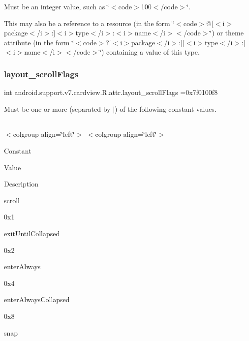 Must be an integer value, such as \char`\"{}$<$code$>$100$<$/code$>$\char`\"{}. 

This may also be a reference to a resource (in the form \char`\"{}$<$code$>$@\mbox{[}$<$i$>$package$<$/i$>$\+:\mbox{]}$<$i$>$type$<$/i$>$\+:$<$i$>$name$<$/i$>$$<$/code$>$\char`\"{}) or theme attribute (in the form \char`\"{}$<$code$>$?\mbox{[}$<$i$>$package$<$/i$>$\+:\mbox{]}\mbox{[}$<$i$>$type$<$/i$>$\+:\mbox{]}$<$i$>$name$<$/i$>$$<$/code$>$\char`\"{}) containing a value of this type. \mbox{\label{classandroid_1_1support_1_1v7_1_1cardview_1_1R_1_1attr_a3b3c1117c3a692d7602eb20227ea8e17}} 
\subsubsection{\texorpdfstring{layout\+\_\+scroll\+Flags}{layout\_scrollFlags}}
{\footnotesize\ttfamily int android.\+support.\+v7.\+cardview.\+R.\+attr.\+layout\+\_\+scroll\+Flags =0x7f0100f8\hspace{0.3cm}{\ttfamily [static]}}

Must be one or more (separated by \textquotesingle{}$\vert$\textquotesingle{}) of the following constant values.

\tabulinesep=1mm
\begin{longtabu} spread 0pt [c]{*{0}{|X[-1]}|}
\hline
\end{longtabu}
$<$colgroup align=\char`\"{}left\char`\"{}$>$ $<$colgroup align=\char`\"{}left\char`\"{}$>$ 

Constant

Value

Description 

{\ttfamily scroll}

0x1

{\ttfamily exit\+Until\+Collapsed}

0x2

{\ttfamily enter\+Always}

0x4

{\ttfamily enter\+Always\+Collapsed}

0x8

{\ttfamily snap}

